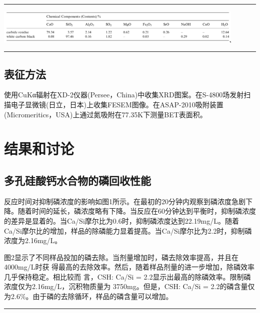 \documentclass[11pt]{article}
\begin{document}
\noindent\rule{\textwidth}{0.5pt}

\includegraphics[width=0.9\textwidth]{table.1.new.png}
 \label{tab:title}

\noindent\rule{\textwidth}{0.5pt}

\subsection{表征方法}
\label{sec:org65ad314}
\setlength{\parindent}{1.0cm}
使用CuKα辐射在XD-2仪器(Persee，China)中收集XRD图案。在S-4800场发射扫描电子显微镜(日立，日本)上收集FESEM图像。在ASAP-2010吸附装置(Micromeritics，USA)上通过氮吸附在77.35K下测量BET表面积。
\par
\section{结果和讨论}
\label{sec:org908a915}
\subsection{多孔硅酸钙水合物的磷回收性能}
\label{sec:orgac4ab57}
\setlength{\parindent}{1.0cm}
反应时间对抑制磷浓度的影响如图1所示。在最初的20分钟内观察到磷浓度急剧下降。随着时间的延长，磷浓度略有下降。当反应在60分钟达到平衡时，抑制磷浓度的差异是显着的。当Ca/Si摩尔比为0.6时，抑制磷浓度达到22.19mg/L。随着Ca/Si摩尔比的增加，样品的除磷能力显着提高。当Ca/Si摩尔比为2.2时，抑制磷浓度为2.16mg/L。
\par

\setlength{\parindent}{1.0cm}
图2显示了不同样品投加的磷去除。当剂量增加时，磷去除效率提高，并且在4000mg/L时获
得最高的去除效率。然后，随着样品剂量的进一步增加，除磷效率几乎保持稳定。相比较而
言，CSH: Ca/Si = 2.2显示出最高的除磷效率。限制磷浓度仅为2.16mg/L，沉积物质量为
3750mg。但是，CSH: Ca/Si = 2.2的磷含量仅为2.6\%。由于磷的去除循环，样品的磷含量可以增加。
\par


\noindent\rule{\textwidth}{0.5pt}
\end{document}
